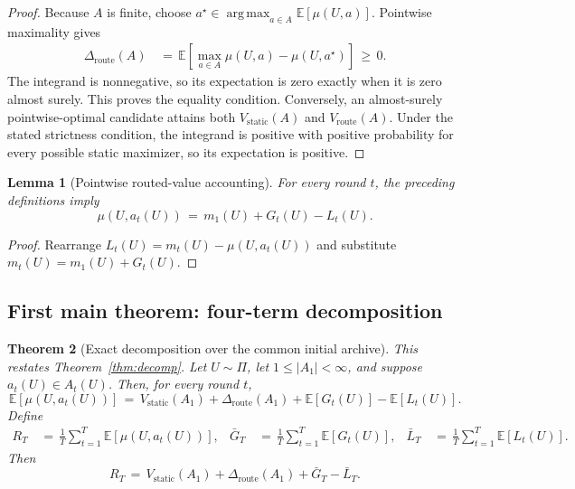 \documentclass{article} %
\newtheorem{theorem}{Theorem}
\newtheorem{lemma}[theorem]{Lemma}
\begin{document}
\begin{proof}
Because \(A\) is finite, choose
\(a^\star\in\operatorname*{arg\,max}_{a\in A}
\mathbb E[\mu(U,a)]\).  Pointwise maximality gives
\begin{equation}
\begin{aligned}
\Delta_{\mathrm{route}}(A)
&\,=\,\mathbb E\!\left[
  \max_{a\in A}\mu(U,a)-\mu(U,a^\star)\right]
\,\geq\,0.
\end{aligned}
\end{equation}
The integrand is nonnegative, so its expectation is zero exactly when it is
zero almost surely.  This proves the equality condition.  Conversely, an
almost-surely pointwise-optimal candidate attains both
\(V_{\mathrm{static}}(A)\) and \(V_{\mathrm{route}}(A)\).  Under the stated
strictness condition, the integrand is positive with positive probability for
every possible static maximizer, so its expectation is positive.
\end{proof}

\begin{lemma}[Pointwise routed-value accounting]
\label{lem:2}
For every round \(t\), the preceding definitions imply
\begin{equation}
\mu(U,a_t(U))
\,=\,
m_1(U)+G_t(U)-L_t(U).
\end{equation}
\end{lemma}

\begin{proof}
Rearrange \(L_t(U)=m_t(U)-\mu(U,a_t(U))\) and substitute
\(m_t(U)=m_1(U)+G_t(U)\).
\end{proof}

\subsection{First main theorem: four-term decomposition}

\begin{theorem}[Exact decomposition over the common initial archive]
\label{thm:main}
This restates Theorem~\ref{thm:decomp}.  Let \(U\sim\Pi\), let
\(1\leq |A_1|<\infty\), and suppose \(a_t(U)\in A_t(U)\).  Then, for every
round \(t\),
\begin{equation}
\mathbb{E}[\mu(U,a_t(U))]
\,=\,
V_{\mathrm{static}}(A_1)
+
\Delta_{\mathrm{route}}(A_1)
+
\mathbb{E}[G_t(U)]
-
\mathbb{E}[L_t(U)].
\end{equation}
Define
\begin{equation}
\begin{aligned}
R_T
&\,=\,\frac1T\sum_{t=1}^T\mathbb E[\mu(U,a_t(U))], &
\bar G_T
&\,=\,\frac1T\sum_{t=1}^T\mathbb E[G_t(U)], &
\bar L_T
&\,=\,\frac1T\sum_{t=1}^T\mathbb E[L_t(U)].
\end{aligned}
\end{equation}
Then
\begin{equation}
\label{eq:app-decomp-bound}
R_T
\,=\,
V_{\mathrm{static}}(A_1)
+
\Delta_{\mathrm{route}}(A_1)
+
\bar G_T
-
\bar L_T.
\end{equation}
\end{theorem}
\end{document}
